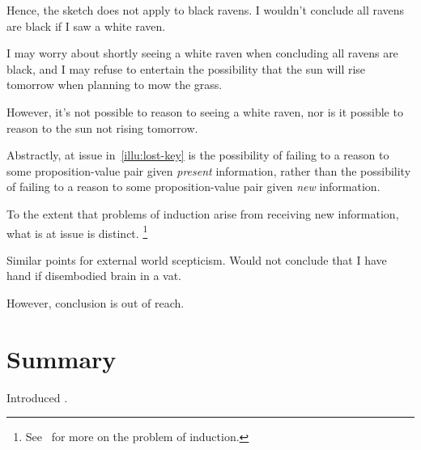 \begin{note}
  Hence, the sketch does not apply to black ravens.
  I wouldn't conclude all ravens are black if I saw a white raven.

  I may worry about shortly seeing a white raven when concluding all ravens are black, and I may refuse to entertain the possibility that the sun will rise tomorrow when planning to mow the grass.

  However, it's not possible to reason to seeing a white raven, nor is it possible to reason to the sun not rising tomorrow.

  Abstractly, at issue in~\autoref{illu:lost-key} is the possibility of failing to a reason to some proposition-value pair given \emph{present} information, rather than the possibility of failing to a reason to some proposition-value pair given \emph{new} information.

  To the extent that problems of induction arise from receiving new information, what is at issue is distinct.%
  \footnote{
    See~\textcite{Henderson:2020wb} for more on the problem of induction.
  }

  Similar points for external world scepticism.
  Would not conclude that I have hand if disembodied brain in a vat.

  However, conclusion is out of reach.
\end{note}

\section{Summary}
\label{sec:summary-1}

\begin{note}
  Introduced .
\end{note}

